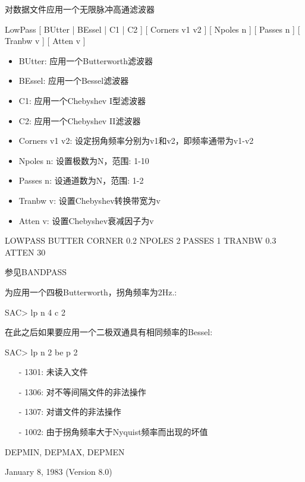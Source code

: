 \label{cmd:lowpass}

对数据文件应用一个无限脉冲高通滤波器

LowPass [ BUtter | BEssel | C1 | C2 ] [ Corners v1 v2 ] [ Npoles n ] [ Passes n ] [ Tranbw v ] [ Atten v ]

\begin{itemize}
\item BUtter: 应用一个Butterworth滤波器
\item BEssel: 应用一个Bessel滤波器
\item C1: 应用一个Chebyshev I型滤波器
\item C2: 应用一个Chebyshev II滤波器
\item Corners v1 v2: 设定拐角频率分别为v1和v2，即频率通带为v1-v2
\item Npoles n: 设置极数为N，范围: 1-10
\item Passes n: 设通道数为N，范围: 1-2
\item Tranbw v: 设置Chebyshev转换带宽为v
\item Atten v: 设置Chebyshev衰减因子为v
\end{itemize}

LOWPASS BUTTER CORNER 0.2 NPOLES 2 PASSES 1 TRANBW 0.3 ATTEN 30

参见BANDPASS

为应用一个四极Butterworth，拐角频率为2Hz.:
\begin{SACCode}
SAC> lp n 4 c 2
\end{SACCode}
在此之后如果要应用一个二极双通具有相同频率的Bessel:
\begin{SACCode}
SAC> lp n 2 be p 2
\end{SACCode}

\begin{itemize}
\item[-]1301: 未读入文件
\item[-]1306: 对不等间隔文件的非法操作
\item[-]1307: 对谱文件的非法操作
\item[-]1002: 由于拐角频率大于Nyquist频率而出现的坏值
\end{itemize}

DEPMIN, DEPMAX, DEPMEN

January 8, 1983 (Version 8.0)
